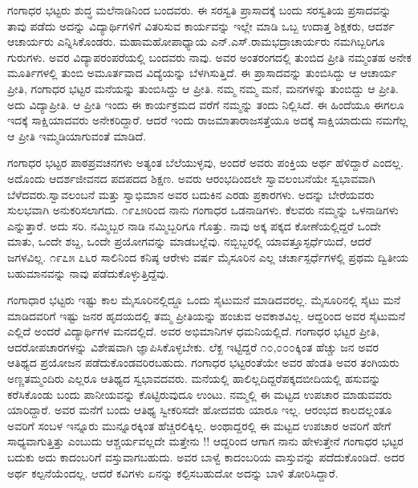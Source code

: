 {ಗಂಗಾಧರ ಭಟ್ಟರು ಶುದ್ಧ ಮಲೆನಾಡಿನಿಂದ ಬಂದವರು. ಈ ಸರಸ್ವತಿ ಪ್ರಾಸಾದಕ್ಕೆ ಬಂದು ಸರಸ್ವತಿಯ ಪ್ರಸಾದವನ್ನು ತಾವು ಪಡೆದು ಅದನ್ನು ವಿದ್ಯಾರ್ಥಿಗಳಿಗೆ ವಿತರಿಸುವ ಕಾರ್ಯವನ್ನು ಇಲ್ಲೇ ಮಾಡಿ ಒಬ್ಬ ಉದಾತ್ತ ಶಿಕ್ಷಕರು, ಆದರ್ಶ ಆಚಾರ್ಯರು ಎನ್ನಿಸಿಕೊಂಡರು. ಮಹಾಮಹೋಪಾಧ್ಯಾಯ ಎನ್.ಎಸ್.ರಾಮಭದ್ರಾಚಾರ್ಯರು ನಮಗಿಬ್ಬರಿಗೂ ಗುರುಗಳು. ಅವರ ವಿದ್ಯಾಪರಂಪರೆಯಲ್ಲಿ  ಬಂದವರು ನಾವು. ಅವರ ಅಂತರಂಗದಲ್ಲಿ ತುಂಬಿದ ಪ್ರೀತಿ ನಮ್ಮಂತಹ ಅನೇಕ ಮೂರ್ತಿಗಳಲ್ಲಿ ತುಂಬಿ ಅಮೂರ್ತ\-ವಾದ ವಿದ್ಯೆಯನ್ನು ಬೆಳಗಿಸುತ್ತಿದೆ. ಈ ಪ್ರಾಸಾದವನ್ನು ತುಂಬಿಸಿದ್ದು ಆ ಆಚಾರ್ಯ ಪ್ರೀತಿ,  ಗಂಗಾಧರ ಭಟ್ಟರ ಮನೆಯನ್ನು ತುಂಬಿಸಿದ್ದು ಆ ಪ್ರೀತಿ. ನಮ್ಮ ನಮ್ಮ ಮನೆ, ಮನಗಳನ್ನು ತುಂಬಿದ್ದು ಆ ಪ್ರೀತಿ. ಅದು ವಿದ್ಯಾಪ್ರೀತಿ. ಆ ಪ್ರೀತಿ ಇಂದು ಈ ಕಾರ್ಯಕ್ರಮದ ವರೆಗೆ ನಮ್ಮನ್ನು ತಂದು ನಿಲ್ಲಿಸಿದೆ. ಈ ಹಿಂದೆಯೂ ಈಗಲೂ ಇದಕ್ಕೆ ಸಾಕ್ಷಿಯಾದವರು ಅನೇಕರಿದ್ದಾರೆ. ಆದರೆ ಇಂದು ರಾಜಮಾತಾ\enginline{-}ರಾಜಸತ್ತೆಯೂ ಅದಕ್ಕೆ ಸಾಕ್ಷಿಯಾದುದು ನಮಗೆಲ್ಲ ಆ ಪ್ರೀತಿ ಇಮ್ಮಡಿಯಾಗುವಂತೆ ಮಾಡಿದೆ.

ಗಂಗಾಧರ ಭಟ್ಟರ ಪಾಠಪ್ರವಚನಗಳು ಅತ್ಯಂತ ಬೆಲೆಯುಳ್ಳವು, ಅಂದರೆ ಅವರು ಪಂಕ್ತಿಯ ಅರ್ಥ ಹೆಳಿದ್ದಾರೆ ಎಂದಲ್ಲ.  ಅದೊಂದು ಆದರ್ಶಜೀವನದ ಪದ\enginline{-}ಪದದ ಶಿಕ್ಷಣ. ಅವರು ಆರಂಭದಿಂದಲೇ ಸ್ವಾವಲಂಬನೆಯೇ ಸ್ವಭಾವವಾಗಿ ಬೆಳೆದವರು.\break ಸ್ವಾವಲಂಬನೆ ಮತ್ತು ಸ್ವಾಭಿಮಾನ ಅವರ ಬದುಕಿನ ಎರಡು ಪ್ರಕಾರಗಳು. ಅದನ್ನು ಬೇರೆಯವರು ಸುಲಭವಾಗಿ ಅನುಕರಿಸಲಾಗದು. ೧೯೭೫ರಿಂದ ನಾನು ಗಂಗಾಧರ ಒಡನಾಡಿಗಳು. ಕೆಲವರು ನಮ್ಮನ್ನು ಒಳನಾಡಿಗಳು ಎನ್ನುತ್ತಾರೆ. ಅದು ಸರಿ. ನಮ್ಮಿಬ್ಬರ ನಾಡಿ ನಮ್ಮಿಬ್ಬರಿಗೂ ಗೊತ್ತು. ನಾವು ಅಕ್ಕ ಪಕ್ಕದ ಕೋಣೆಯಲ್ಲಿದ್ದರೆ ಒಂದೇ ಮಾತು, ಒಂದೇ ಶಬ್ದ, ಒಂದೇ ಪ್ರಯೋಗವನ್ನು ಮಾಡಬಲ್ಲೆವು. ನಬ್ಬಿಬ್ಬರಲ್ಲಿ ಯಾವತ್ತೂ\break ಸ್ಫರ್ಧೆಯಿದೆ, ಆದರೆ ಜಗಳವಿಲ್ಲ. ೧೯೭೫ \enginline{-}೭೬ರ ಸಾಲಿನಿಂದ ಕನಿಷ್ಠ ಆರೇಳು ವರ್ಷ ಮೈಸೂರಿನ ಎಲ್ಲ ಚರ್ಚಾಸ್ಪರ್ಧೆಗಳಲ್ಲಿ ಪ್ರಥಮ ದ್ವಿತೀಯ ಬಹುಮಾನವನ್ನು ನಾವು ಪಡೆದು\-ಕೊಳ್ಳುತ್ತಿದ್ದೆವು.

ಗಂಗಾಧಾರ ಭಟ್ಟರು ಇಷ್ಟು ಕಾಲ ಮೈಸೂರಿನಲ್ಲಿದ್ದೂ ಒಂದು ಸೈಟು\enginline{-}ಮನೆ ಮಾಡಿದವರಲ್ಲ. ಮೈಸೂರಿನಲ್ಲಿ ಸೈಟು ಮನೆ ಮಾಡಿದವರಿಗೆ ಇಷ್ಟು ಜನರ ಹೃದಯದಲ್ಲಿ ತಮ್ಮ ಪ್ರೀತಿಯನ್ನು ಹಂಚುವ ಅವಕಾಶವಿಲ್ಲ. ಆದ್ದರಿಂದ ಅವರ ಸೈಟು\enginline{-}ಮನೆ ಎಲ್ಲಿದೆ ಅಂದರೆ ವಿದ್ಯಾರ್ಥಿಗಳ ಮನದಲ್ಲಿದೆ. ಅವರ ಅಭಿಮಾನಿಗಳ ಧಮನಿಯಲ್ಲಿದೆ. ಗಂಗಾಧರ ಭಟ್ಟರ ಪ್ರೀತಿ, ಆದರೋಪಚಾರಗಳನ್ನು ವಿಶೇಷವಾಗಿ ಜ್ಞಾಪಿಸಿಕೊಳ್ಳಬೇಕು. ಲೆಕ್ಖ ಇಟ್ಟಿದ್ದರೆ ೧೦,೦೦೦ಕ್ಕಿಂತ ಹೆಚ್ಚು ಜನ ಅವರ ಆತಿಥ್ಯದ ಪ್ರಯೋಜನ ಪಡೆದುಕೊಂಡವರಿರಬಹುದು. ಗಂಗಾಧರ ಭಟ್ಟರಂತೆಯೇ ಅವರ ಹೆಂಡತಿ ಅವರ ತಂಗಿಯರು ಅಣ್ಣ\enginline{-}ತಮ್ಮಂದಿರು ಎಲ್ಲರೂ ಆತಿಥ್ಯದ ಸ್ವಭಾವದವರು. ಮನೆಯಲ್ಲಿ ಹಾಲಿಲ್ಲದಿದ್ದರೆ\break ಪಕ್ಕದಬೀದಿಯಲ್ಲಿ ಹಸುವನ್ನು ಕರೆಸಿಕೊಂಡು ಬಂದು ಪಾನೀಯವನ್ನು ಕೊಟ್ಟಿರು\-ವುದೂ ಉಂಟು. ನಮ್ಮಲ್ಲಿ ಈ ಮಟ್ಟದ ಉಪಚಾರ ಮಾಡುವವರು ಯಾರಿದ್ದಾರೆ. ಅವರ ಮನೆಗೆ ಬಂದು ಆತಿಥ್ಯ ಸ್ವೀಕರಿಸದೇ ಹೋದವರು ಯಾರೂ ಇಲ್ಲ. ಆರಂಭದ ಕಾಲದಲ್ಲಂತೂ ಅವರಿಗೆ ಸಂಬಳ ಇನ್ನೂರು ಮುನ್ನೂರಕ್ಕಿಂತ ಹೆಚ್ಚಿರಲಿಕ್ಕಿಲ್ಲ. ಅಂಥಾದ್ದರಲ್ಲಿ ಈ ಮಟ್ಟದ ಉಪಚಾರ ಅವರಿಗೆ ಹೇಗೆ ಸಾಧ್ಯವಾಗುತ್ತಿತ್ತು ಎಂಬುದು ಆಶ್ಚರ್ಯವಲ್ಲದೇ ಮತ್ತೇನು !! ಆದ್ದರಿಂದ ಆಗಾಗ ನಾನು ಹೇಳುತ್ತೇನೆ ಗಂಗಾಧರ ಭಟ್ಟರ ಬದುಕು ಅದು \hbox{ಕಾದಂಬರಿಗೆ} ವಸ್ತುವಾಗಬಹುದು. ಅವರ ಬಾಳ್ವೆ ಕಾದಂಬರಿಯ ವಾಸ್ತುವನ್ನು ಪದೆದುಕೊಂಡಿದೆ. ಅದರ ಅರ್ಥ ಕಲ್ಪನೆಯೆಂದಲ್ಲ. ಆದರೆ ಕವಿಗಳು ಏನನ್ನು ಕಲ್ಪಿಸಬಹುದೋ ಅದನ್ನು ಬಾಳಿ ತೋರಿಸಿದ್ದಾರೆ.

}
